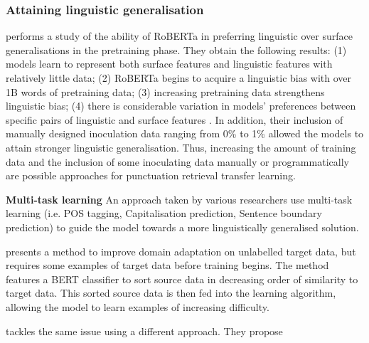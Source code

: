 \documentclass[a4paper]{article}
\begin{document}
\begin{multicols}{2}
\subsubsection{Attaining linguistic generalisation}
\citet{robertaAcquireLinguisticPreference} performs a study of the ability of RoBERTa in preferring linguistic over surface generalisations in the pretraining phase. They obtain the following results: 
(1) models learn to represent both surface features and linguistic features with relatively little data; 
(2) RoBERTa begins to acquire a linguistic bias with over 1B words of pretraining data; 
(3) increasing pretraining data strengthens linguistic bias; 
(4) there is considerable variation in models’ preferences between specific pairs of linguistic and surface features \citep{robertaAcquireLinguisticPreference}. 
In addition, their inclusion of manually designed inoculation data ranging from 0\% to 1\% allowed the models to attain stronger linguistic generalisation. Thus, increasing the amount of training data and the inclusion of some inoculating data manually or programmatically are possible approaches for punctuation retrieval transfer learning.

\textbf{Multi-task learning} An approach taken by various researchers \citep{adversarial,jointlearningcorrbirnn, dynamiccrf} use multi-task learning (i.e. POS tagging, Capitalisation prediction, Sentence boundary prediction) to guide the model towards a more linguistically generalised solution.

\citet{domainAdaptationBERT} presents a method to improve domain adaptation on unlabelled target data, but requires some examples of target data before training begins. The method features a BERT classifier to sort source data in decreasing order of similarity to target data. This sorted source data is then fed into the learning algorithm, allowing the model to learn examples of increasing difficulty.

\citet{clim} tackles the same issue using a different approach. They propose 



\end{multicols}
\end{document}

